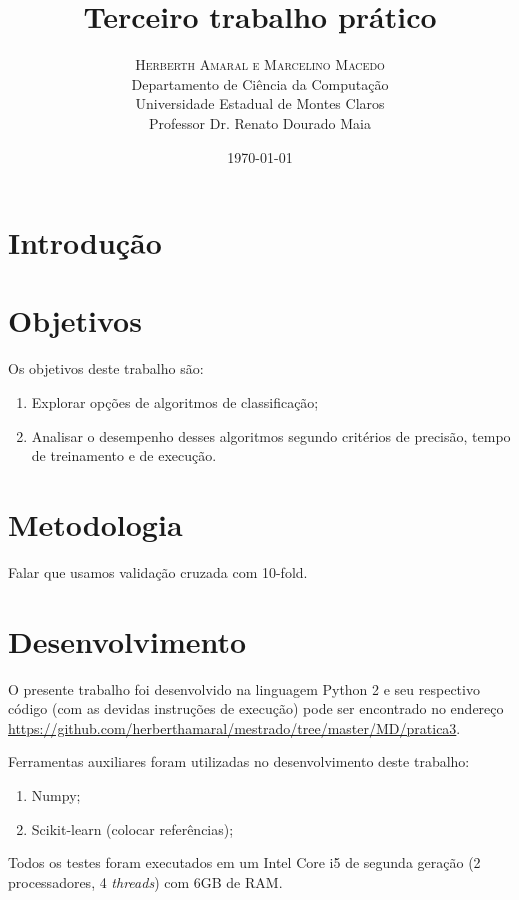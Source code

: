 \documentclass[11pt]{article}
\title{\vspace{.5cm}\fontsize{24pt}{10pt}\selectfont\textbf{\sc Terceiro trabalho prático}} %
\author{
\large
\textsc{Herberth Amaral e Marcelino Macedo}\\[2mm]
\normalsize Departamento de Ciência da Computação \\
\normalsize Universidade Estadual de Montes Claros \\
\normalsize Professor Dr. Renato Dourado Maia\\
\vspace{-5mm}
}
\date{\today}
\begin{document}
\maketitle %

\thispagestyle{fancy} %

\newpage

\section{Introdução}
\section{Objetivos}

Os objetivos deste trabalho são:

\begin{enumerate}
    \item Explorar opções de algoritmos de classificação;
    \item Analisar o desempenho desses algoritmos segundo critérios de precisão, tempo de treinamento e de execução.
\end{enumerate}

\section{Metodologia}

Falar que usamos validação cruzada com 10-fold.

\section{Desenvolvimento}

O presente trabalho foi desenvolvido na linguagem Python 2 e seu respectivo
código (com as devidas instruções de execução) pode ser encontrado no endereço
\url{https://github.com/herberthamaral/mestrado/tree/master/MD/pratica3}.

Ferramentas auxiliares foram utilizadas no desenvolvimento deste trabalho:

\begin{enumerate}
    \item Numpy;
    \item Scikit-learn (colocar referências);
\end{enumerate}

Todos os testes foram executados em um Intel Core i5 de segunda geração (2
processadores, 4 \textit{threads}) com 6GB de RAM.
\end{document}
